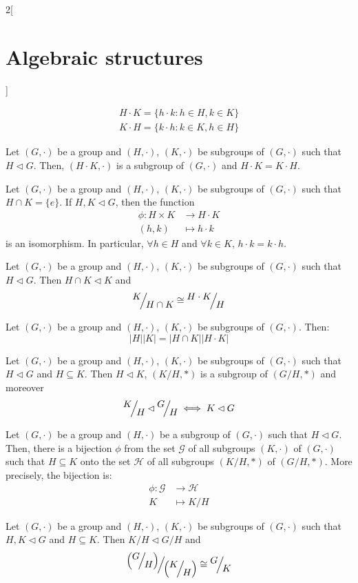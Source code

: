 \documentclass[../../../main.tex]{subfiles}
\begin{document}
\begin{multicols}{2}[\section{Algebraic structures}]
\begin{definition}
    \begin{gather*}
        H\cdot K=\{h\cdot k:h\in H,k\in K\}\\
        K\cdot H=\{k\cdot h:k\in K,h\in H\}
    \end{gather*}
\end{definition}
\begin{prop}
    Let $(G,\cdot)$ be a group and $(H,\cdot)$, $(K,\cdot)$ be subgroups of $(G,\cdot)$ such that $H\lhd G$. Then, $(H\cdot K,\cdot)$ is a subgroup of $(G,\cdot)$ and $H\cdot K=K\cdot H$.
\end{prop}
\begin{prop}
    Let $(G,\cdot)$ be a group and $(H,\cdot)$, $(K,\cdot)$ be subgroups of $(G,\cdot)$ such that $H\cap K=\{e\}$. If $H,K\lhd G$, then the function 
    \begin{align*}
        \phi:H\times K&\longrightarrow H\cdot K\\
        (h,k)&\longmapsto h\cdot k
    \end{align*}
    is an isomorphism. In particular, $\forall h\in H$ and $\forall k\in K$, $h\cdot k=k\cdot h$.
\end{prop}
\begin{theorem}
    Let $(G,\cdot)$ be a group and $(H,\cdot)$, $(K,\cdot)$ be subgroups of $(G,\cdot)$ such that $H\lhd G$. Then $H\cap K\lhd K$ and $$\quot{K}{H\cap K}\cong\quot{H\cdot K}{H}$$
\end{theorem}
\begin{corollary}
    Let $(G,\cdot)$ be a group and $(H,\cdot)$, $(K,\cdot)$ be subgroups of $(G,\cdot)$. Then: $$|H||K|=|H\cap K||H\cdot K|$$
\end{corollary}
\begin{lemma}
    Let $(G,\cdot)$ be a group and $(H,\cdot)$, $(K,\cdot)$ be subgroups of $(G,\cdot)$ such that $H\lhd G$ and $H\subseteq K$. Then $H\lhd K$, $(K/H,*)$ is a subgroup of $(G/H,*)$ and moreover $$\quot{K}{H}\lhd\quot{G}{H}\iff K\lhd G$$
\end{lemma}
\begin{theorem}
    Let $(G,\cdot)$ be a group and $(H,\cdot)$ be a subgroup of $(G,\cdot)$ such that $H\lhd G$. Then, there is a bijection $\phi$ from the set $\mathcal{G}$ of all subgroups $(K,\cdot)$ of $(G,\cdot)$ such that $H\subseteq K$ onto the set $\mathcal{H}$ of all subgroups $\left(K/H,*\right)$ of $\left(G/H,*\right)$. More precisely, the bijection is:
    \begin{align*}
        \phi:\mathcal{G}&\longrightarrow\mathcal{H}\\
        K&\longmapsto K/H
    \end{align*}
\end{theorem}
\begin{theorem}
    Let $(G,\cdot)$ be a group and $(H,\cdot)$, $(K,\cdot)$ be subgroups of $(G,\cdot)$ such that $H,K\lhd G$ and $H\subseteq K$. Then $K/H\lhd G/H$ and $$\quot{\left(\quot{G}{H}\right)}{\left(\quot{K}{H}\right)}\cong\quot{G}{K}$$
\end{theorem}

\end{multicols}
\end{document}

